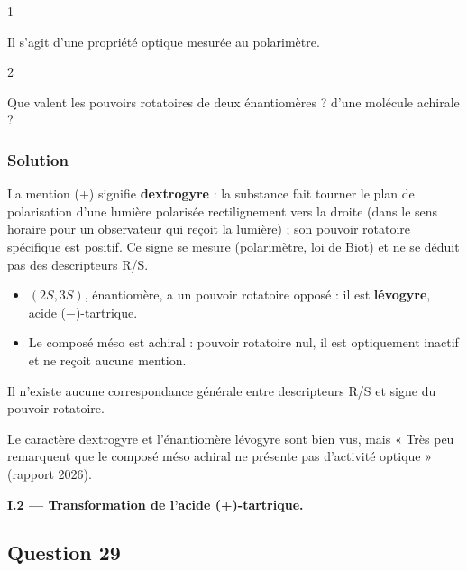 \documentclass[11pt,a4paper]{article}
\providecommand{\tightlist}{\setlength{\itemsep}{0pt}\setlength{\parskip}{0pt}}
\begin{document}
\begin{indication}{1}

Il s'agit d'une propriété optique mesurée au polarimètre.

\end{indication}

\begin{indication}{2}

Que valent les pouvoirs rotatoires de deux énantiomères ? d'une molécule achirale ?

\end{indication}

\hypertarget{solution-27}{%
\subsubsection{Solution}\label{solution-27}}

La mention (+) signifie \textbf{dextrogyre} : la substance fait tourner le plan de polarisation d'une lumière polarisée rectilignement vers la droite (dans le sens horaire pour un observateur qui reçoit la lumière) ; son pouvoir rotatoire spécifique est positif. Ce signe se mesure (polarimètre, loi de Biot) et ne se déduit pas des descripteurs R/S.

\begin{itemize}
\tightlist
\item
  \((2S,3S)\), énantiomère, a un pouvoir rotatoire opposé : il est \textbf{lévogyre}, acide (−)-tartrique.
\item
  Le composé méso est achiral : pouvoir rotatoire nul, il est optiquement inactif et ne reçoit aucune mention.
\end{itemize}

\begin{piege}

Il n'existe aucune correspondance générale entre descripteurs R/S et signe du pouvoir rotatoire.

\end{piege}

\begin{jury}

Le caractère dextrogyre et l'énantiomère lévogyre sont bien vus, mais « Très peu remarquent que le composé méso achiral ne présente pas d'activité optique » (rapport 2026).

\end{jury}

\textbf{I.2 --- Transformation de l'acide (+)-tartrique.}

\hypertarget{question-29}{%
\subsection{Question 29}\label{question-29}}
\end{document}
